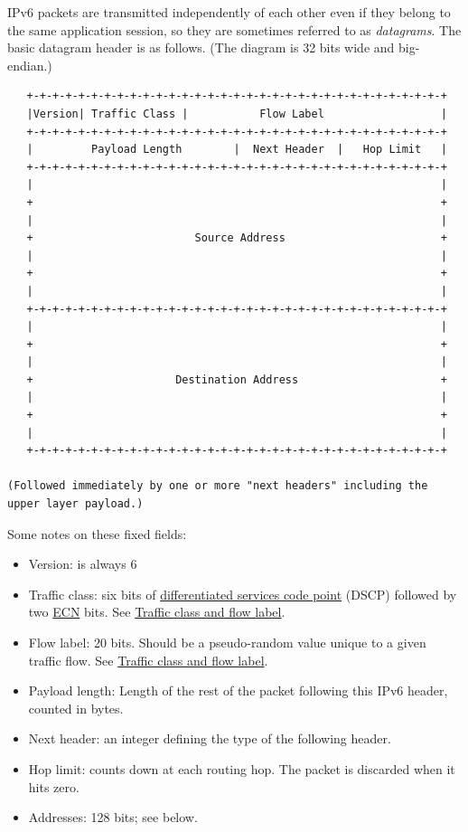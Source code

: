 \documentclass[
]{article}
\begin{document}
IPv6 packets are transmitted independently of each other even if they
belong to the same application session, so they are sometimes referred
to as \emph{datagrams}. The basic datagram header is as follows. (The
diagram is 32 bits wide and big-endian.)

\begin{verbatim}
   +-+-+-+-+-+-+-+-+-+-+-+-+-+-+-+-+-+-+-+-+-+-+-+-+-+-+-+-+-+-+-+-+
   |Version| Traffic Class |           Flow Label                  |
   +-+-+-+-+-+-+-+-+-+-+-+-+-+-+-+-+-+-+-+-+-+-+-+-+-+-+-+-+-+-+-+-+
   |         Payload Length        |  Next Header  |   Hop Limit   |
   +-+-+-+-+-+-+-+-+-+-+-+-+-+-+-+-+-+-+-+-+-+-+-+-+-+-+-+-+-+-+-+-+
   |                                                               |
   +                                                               +
   |                                                               |
   +                         Source Address                        +
   |                                                               |
   +                                                               +
   |                                                               |
   +-+-+-+-+-+-+-+-+-+-+-+-+-+-+-+-+-+-+-+-+-+-+-+-+-+-+-+-+-+-+-+-+
   |                                                               |
   +                                                               +
   |                                                               |
   +                      Destination Address                      +
   |                                                               |
   +                                                               +
   |                                                               |
   +-+-+-+-+-+-+-+-+-+-+-+-+-+-+-+-+-+-+-+-+-+-+-+-+-+-+-+-+-+-+-+-+

(Followed immediately by one or more "next headers" including the
upper layer payload.)
\end{verbatim}

Some notes on these fixed fields:

\begin{itemize}
\item
  Version: is always 6
\item
  Traffic class: six bits of
  \href{https://www.rfc-editor.org/info/rfc2474}{differentiated services
  code point} (DSCP) followed by two
  \href{https://www.rfc-editor.org/info/rfc3168}{ECN} bits. See
  \hyperref[traffic-class-and-flow-label]{Traffic class and flow label}.
\item
  Flow label: 20 bits. Should be a pseudo-random value unique to a given
  traffic flow. See \hyperref[traffic-class-and-flow-label]{Traffic
  class and flow label}.
\item
  Payload length: Length of the rest of the packet following this IPv6
  header, counted in bytes.
\item
  Next header: an integer defining the type of the following header.
\item
  Hop limit: counts down at each routing hop. The packet is discarded
  when it hits zero.
\item
  Addresses: 128 bits; see below.
\end{itemize}
\end{document}
